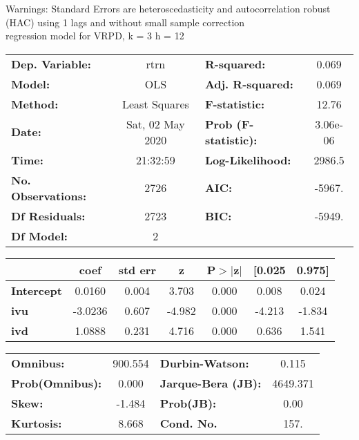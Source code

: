 Warnings: \newline
 [1] Standard Errors are heteroscedasticity and autocorrelation robust (HAC) using 1 lags and without small sample correction\\ 

regression model for VRPD, k = 3 h = 12\begin{center}
\begin{tabular}{lclc}
\toprule
\textbf{Dep. Variable:}    &       rtrn       & \textbf{  R-squared:         } &     0.069   \\
\textbf{Model:}            &       OLS        & \textbf{  Adj. R-squared:    } &     0.069   \\
\textbf{Method:}           &  Least Squares   & \textbf{  F-statistic:       } &     12.76   \\
\textbf{Date:}             & Sat, 02 May 2020 & \textbf{  Prob (F-statistic):} &  3.06e-06   \\
\textbf{Time:}             &     21:32:59     & \textbf{  Log-Likelihood:    } &    2986.5   \\
\textbf{No. Observations:} &        2726      & \textbf{  AIC:               } &    -5967.   \\
\textbf{Df Residuals:}     &        2723      & \textbf{  BIC:               } &    -5949.   \\
\textbf{Df Model:}         &           2      & \textbf{                     } &             \\
\bottomrule
\end{tabular}
\begin{tabular}{lcccccc}
                   & \textbf{coef} & \textbf{std err} & \textbf{z} & \textbf{P$> |$z$|$} & \textbf{[0.025} & \textbf{0.975]}  \\
\midrule
\textbf{Intercept} &       0.0160  &        0.004     &     3.703  &         0.000        &        0.008    &        0.024     \\
\textbf{ivu}       &      -3.0236  &        0.607     &    -4.982  &         0.000        &       -4.213    &       -1.834     \\
\textbf{ivd}       &       1.0888  &        0.231     &     4.716  &         0.000        &        0.636    &        1.541     \\
\bottomrule
\end{tabular}
\begin{tabular}{lclc}
\textbf{Omnibus:}       & 900.554 & \textbf{  Durbin-Watson:     } &    0.115  \\
\textbf{Prob(Omnibus):} &   0.000 & \textbf{  Jarque-Bera (JB):  } & 4649.371  \\
\textbf{Skew:}          &  -1.484 & \textbf{  Prob(JB):          } &     0.00  \\
\textbf{Kurtosis:}      &   8.668 & \textbf{  Cond. No.          } &     157.  \\
\bottomrule
\end{tabular}
\end{center}

